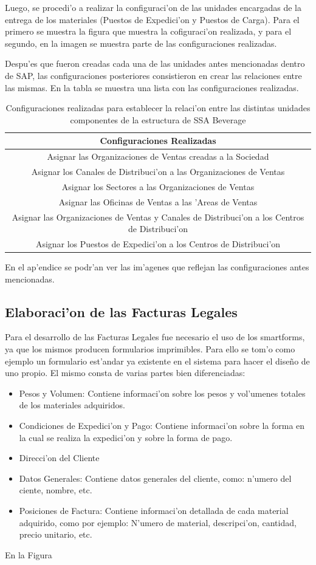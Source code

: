 	Luego, se procedi'o a realizar la configuraci'on de las unidades encargadas de la entrega de los materiales (Puestos de Expedici'on y Puestos de Carga). Para el primero se muestra la figura que muestra la cofiguraci'on realizada, y para el segundo, en la imagen se muestra parte de las configuraciones realizadas.

Despu'es que fueron creadas cada una de las unidades antes mencionadas dentro de SAP, las configuraciones posteriores consistieron en crear las relaciones entre las mismas. En la tabla se muestra una lista con las configuraciones realizadas.
\begin{table}[htb]
\footnotesize
\begin{tabular}{|c|}
\hline
\textbf{Configuraciones Realizadas}\\
\hline
 Asignar las Organizaciones de Ventas creadas a la Sociedad\\
\hline
Asignar los Canales de Distribuci'on a las Organizaciones de Ventas\\
\hline
Asignar los Sectores a las Organizaciones de Ventas \\
\hline
Asignar las Oficinas de Ventas a las 'Areas de Ventas\\
\hline
Asignar las Organizaciones de Ventas y Canales de Distribuci'on a los Centros de Distribuci'on\\
\hline
Asignar los Puestos de Expedici'on a los Centros de Distribuci'on\\
\hline
\end{tabular}
\caption{Configuraciones realizadas para establecer la relaci'on entre las distintas unidades componentes de la estructura de SSA Beverage}
\label{tb:asignaciones}
\end{table}
En el ap'endice se podr'an ver las im'agenes que reflejan las configuraciones antes mencionadas.
\subsection{Elaboraci'on de las Facturas Legales}
	Para el desarrollo de las Facturas Legales fue necesario el uso de los smartforms, ya que los mismos producen formularios imprimibles. Para ello se tom'o como ejemplo un formulario est'andar ya existente en el sistema para hacer el dise\~no de uno propio. El mismo consta de varias partes bien diferenciadas:
\begin{itemize}
\item Pesos y Volumen: Contiene informaci'on sobre los pesos y vol'umenes totales de los materiales adquiridos.
\item Condiciones de Expedici'on y Pago: Contiene informaci'on sobre la forma en la cual se realiza la expedici'on y sobre la forma de pago.
\item Direcci'on del Cliente
\item Datos Generales: Contiene datos generales del cliente, como: n'umero del ciente, nombre, etc.
\item Posiciones de Factura: Contiene informaci'on detallada de cada material adquirido, como por ejemplo: N'umero de material, descripci'on, cantidad, precio unitario, etc.
\end{itemize}
	En la Figura  


